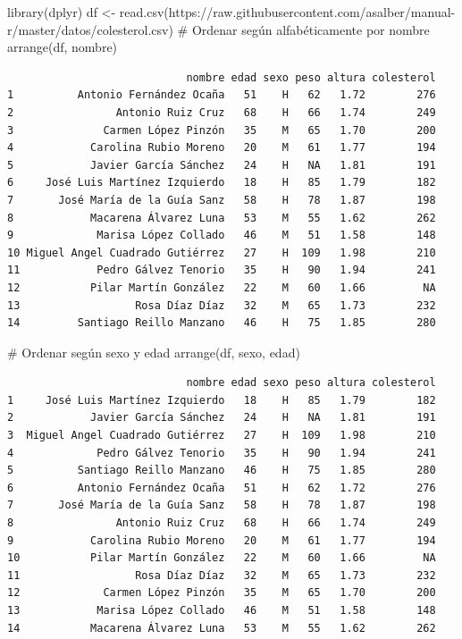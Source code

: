 \documentclass[
  a4paper,
]{scrreport}
\newenvironment{Shaded}{\begin{snugshade}}{\end{snugshade}}
\newcommand{\CommentTok}[1]{\textcolor[rgb]{0.37,0.37,0.37}{#1}}
\newcommand{\FunctionTok}[1]{\textcolor[rgb]{0.28,0.35,0.67}{#1}}
\newcommand{\NormalTok}[1]{\textcolor[rgb]{0.00,0.23,0.31}{#1}}
\newcommand{\OtherTok}[1]{\textcolor[rgb]{0.00,0.23,0.31}{#1}}
\newcommand{\StringTok}[1]{\textcolor[rgb]{0.13,0.47,0.30}{#1}}
\theoremstyle{definition}
\theoremstyle{definition}
\theoremstyle{remark}
\begin{document}
\begin{Shaded}
\begin{Highlighting}[]
\FunctionTok{library}\NormalTok{(dplyr)}
\NormalTok{df }\OtherTok{\textless{}{-}} \FunctionTok{read.csv}\NormalTok{(}\StringTok{\textquotesingle{}https://raw.githubusercontent.com/asalber/manual{-}r/master/datos/colesterol.csv\textquotesingle{}}\NormalTok{)}
\CommentTok{\# Ordenar según alfabéticamente por nombre}
\FunctionTok{arrange}\NormalTok{(df, nombre)}
\end{Highlighting}
\end{Shaded}

\begin{verbatim}
                            nombre edad sexo peso altura colesterol
1          Antonio Fernández Ocaña   51    H   62   1.72        276
2                Antonio Ruiz Cruz   68    H   66   1.74        249
3              Carmen López Pinzón   35    M   65   1.70        200
4            Carolina Rubio Moreno   20    M   61   1.77        194
5            Javier García Sánchez   24    H   NA   1.81        191
6     José Luis Martínez Izquierdo   18    H   85   1.79        182
7       José María de la Guía Sanz   58    H   78   1.87        198
8            Macarena Álvarez Luna   53    M   55   1.62        262
9             Marisa López Collado   46    M   51   1.58        148
10 Miguel Angel Cuadrado Gutiérrez   27    H  109   1.98        210
11            Pedro Gálvez Tenorio   35    H   90   1.94        241
12           Pilar Martín González   22    M   60   1.66         NA
13                  Rosa Díaz Díaz   32    M   65   1.73        232
14         Santiago Reillo Manzano   46    H   75   1.85        280
\end{verbatim}

\begin{Shaded}
\begin{Highlighting}[]
\CommentTok{\# Ordenar según sexo y edad}
\FunctionTok{arrange}\NormalTok{(df, sexo, edad)}
\end{Highlighting}
\end{Shaded}

\begin{verbatim}
                            nombre edad sexo peso altura colesterol
1     José Luis Martínez Izquierdo   18    H   85   1.79        182
2            Javier García Sánchez   24    H   NA   1.81        191
3  Miguel Angel Cuadrado Gutiérrez   27    H  109   1.98        210
4             Pedro Gálvez Tenorio   35    H   90   1.94        241
5          Santiago Reillo Manzano   46    H   75   1.85        280
6          Antonio Fernández Ocaña   51    H   62   1.72        276
7       José María de la Guía Sanz   58    H   78   1.87        198
8                Antonio Ruiz Cruz   68    H   66   1.74        249
9            Carolina Rubio Moreno   20    M   61   1.77        194
10           Pilar Martín González   22    M   60   1.66         NA
11                  Rosa Díaz Díaz   32    M   65   1.73        232
12             Carmen López Pinzón   35    M   65   1.70        200
13            Marisa López Collado   46    M   51   1.58        148
14           Macarena Álvarez Luna   53    M   55   1.62        262
\end{verbatim}
\end{document}
